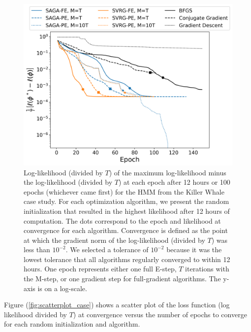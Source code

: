 \begin{figure}
    \centering
    \includegraphics[width=6in]{../plt/log-like_v_epoch_K-3-3.png}
    \caption{Log-likelihood (divided by $T$) of the maximum log-likelihood minus the log-likelihood (divided by $T$) at each epoch after 12 hours or 100 epochs (whichever came first) for the HMM from the Killer Whale case study. For each optimization algorithm, we present the random initialization that resulted in the highest likelihood after 12 hours of computation. The dots correspond to the epoch and likelihood at convergence for each algorithm. Convergence is defined as the point at which the gradient norm of the log-likelihood (divided by $T$) was less than $10^{-2}$. We selected a tolerance of $10^{-2}$ because it was the lowest tolerance that all algorithms regularly converged to within 12 hours. One epoch represents either one full E-step, $T$ iterations with the M-step, or one gradient step for full-gradient algorithms. The y-axis is on a log-scale.}
    \label{fig:ll_trace_case}
\end{figure}
%
Figure (\ref{fig:scatterplot_case}) shows a scatter plot of the loss function (log likelihood divided by $T$) at convergence versus the number of epochs to converge for each random initialization and algorithm.
%
